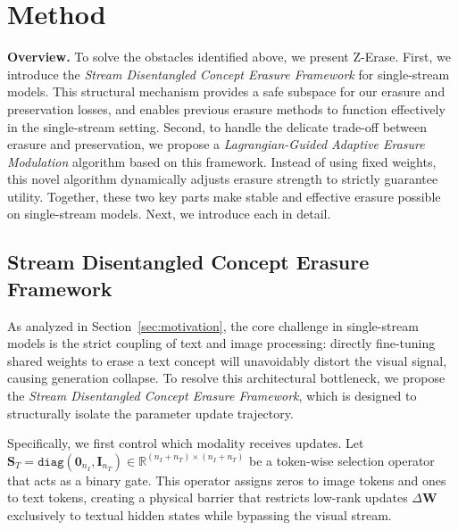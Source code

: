 \section{Method}


\textbf{Overview.} 
To solve the obstacles identified above, we present Z-Erase. First, we introduce the \emph{Stream Disentangled Concept Erasure Framework} for single-stream models. This structural mechanism provides a safe subspace for our erasure and preservation losses, and enables previous erasure methods to function effectively in the single-stream setting. Second, to handle the delicate trade-off between erasure and preservation, we propose a \emph{Lagrangian-Guided Adaptive Erasure Modulation} algorithm based on this framework. Instead of using fixed weights, this novel algorithm dynamically adjusts erasure strength to strictly guarantee utility. Together, these two key parts make stable and effective erasure possible on single-stream models. Next, we introduce each in detail.





\subsection{Stream Disentangled Concept Erasure Framework}

As analyzed in Section~\ref{sec:motivation}, the core challenge in single-stream models is the strict coupling of text and image processing: directly fine-tuning shared weights to erase a text concept will unavoidably distort the visual signal, causing generation collapse. To resolve this architectural bottleneck, we propose the \emph{Stream Disentangled Concept Erasure Framework}, which is designed to structurally isolate the parameter update trajectory.

Specifically, we first control which modality receives updates. Let $\mathbf{S}_T = \mathtt{diag}(\mathbf{0}_{n_I}, \mathbf{I}_{n_T}) \in \mathbb{R}^{(n_I + n_T) \times (n_I + n_T)}$ be a token-wise selection operator that acts as a binary gate. This operator assigns zeros to image tokens and ones to text tokens, creating a physical barrier that restricts low-rank updates $\Delta \mathbf{W}$ exclusively to textual hidden states while bypassing the visual stream.



